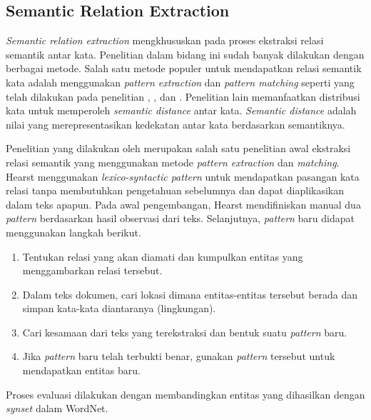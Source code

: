 \subsection{Semantic Relation Extraction}
\textit{Semantic relation extraction} mengkhususkan pada proses ekstraksi relasi semantik antar kata. Penelitian dalam bidang ini sudah banyak dilakukan dengan berbagai metode. Salah satu metode populer untuk mendapatkan relasi semantik kata adalah menggunakan \textit{pattern extraction} dan \textit{pattern matching} seperti yang telah dilakukan pada penelitian \cite{hearst1992automatic}, \cite{ruiz2005automatic}, dan \cite{arnold2014extracting}. Penelitian lain memanfaatkan distribusi kata untuk memperoleh \textit{semantic distance} antar kata. \textit{Semantic distance} adalah nilai yang merepresentasikan kedekatan antar kata berdasarkan semantiknya.

Penelitian yang dilakukan oleh \cite{hearst1992automatic} merupakan salah satu penelitian awal ekstraksi relasi semantik yang menggunakan metode \textit{pattern extraction} dan \textit{matching}. Hearst menggunakan \textit{lexico-syntactic pattern} untuk mendapatkan pasangan kata relasi tanpa membutuhkan pengetahuan sebelumnya dan dapat diaplikasikan dalam teks apapun. Pada awal pengembangan, Hearst mendifiniskan manual dua \textit{pattern} berdasarkan hasil observasi dari teks. Selanjutnya, \textit{pattern} baru didapat menggunakan langkah berikut. 
\begin{enumerate}
  \item Tentukan relasi yang akan diamati dan kumpulkan entitas yang menggambarkan relasi tersebut.
  \item Dalam teks dokumen, cari lokasi dimana entitas-entitas tersebut berada dan simpan kata-kata diantaranya (lingkungan).
  \item Cari kesamaan dari teks yang terekstraksi dan bentuk suatu \textit{pattern} baru.
  \item Jika \textit{pattern} baru telah terbukti benar, gunakan \textit{pattern} tersebut untuk mendapatkan entitas baru.
\end{enumerate}
Proses evaluasi dilakukan dengan membandingkan entitas yang dihasilkan dengan \textit{synset} dalam WordNet. 


